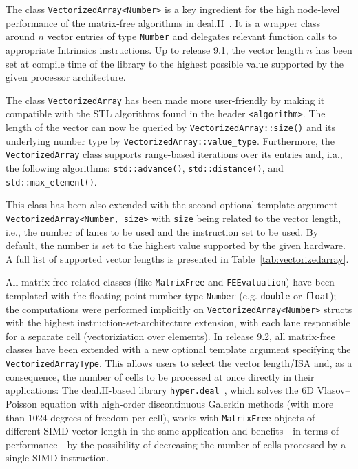 \documentclass{ansarticle-preprint}
\begin{document}
The class \texttt{VectorizedArray<Number>} is a key ingredient for the high 
node-level performance of the matrix-free algorithms in deal.II~\cite{KronbichlerKormann2012, KronbichlerKormann2019}. It is a wrapper 
class around $n$ vector entries of type \texttt{Number} and delegates relevant 
function calls to appropriate Intrinsics instructions. Up to release 9.1, the 
vector length $n$ has been set at compile time of the library to the highest 
possible value supported by the given processor architecture.

The class \texttt{VectorizedArray} has been made more user-friendly by making 
it compatible with the STL algorithms found in the header \texttt{<algorithm>}. 
The length of the  vector can now be queried by  \texttt{VectorizedArray::size()} and its underlying number type by \texttt{VectorizedArray::value\_type}. 
Furthermore, the \texttt{VectorizedArray} class supports range-based iterations over its entries and, i.a., the following 
algorithms: \texttt{std::\allowbreak ad\-vance()}, \texttt{std::distance()}, and \texttt{std::max\_element()}.

This class has been also extended with the second optional template argument 
\texttt{VectorizedArray<Number, size>} with \texttt{size} being related to the 
vector length, i.e., the number of lanes to be used and the instruction set to be 
used. By default, the number is set to the highest value supported by the given 
hardware. A full list of supported 
vector lengths is presented in Table~\ref{tab:vectorizedarray}.

All matrix-free related classes (like \texttt{MatrixFree} and \texttt{FEEvaluation}) 
have been templated with the floating-point number type \texttt{Number} (e.g. \texttt{double} or \texttt{float}); the computations were performed implicitly 
on \texttt{VectorizedArray<Number>} structs with the highest 
instruction-set-architecture extension, with each lane responsible for a separate 
cell (vectoriziation over elements). In release 9.2, all matrix-free classes 
have been extended with a new optional template argument specifying the 
\texttt{VectorizedArrayType}. This allows users to select the vector length/ISA and, 
as a consequence, the number of cells to be processed at once directly in their applications: 
The deal.II-based 
library \texttt{hyper.deal}~\cite{munch2020hyperdeal}, which solves the 6D Vlasov--Poisson equation with high-order 
discontinuous Galerkin methods (with more than 1024 degrees of freedom per cell), works with \texttt{MatrixFree} objects of different SIMD-vector 
length in the same application and benefits---in terms of performance---by the possibility of decreasing the number of cells processed by a single SIMD instruction.
\end{document}
